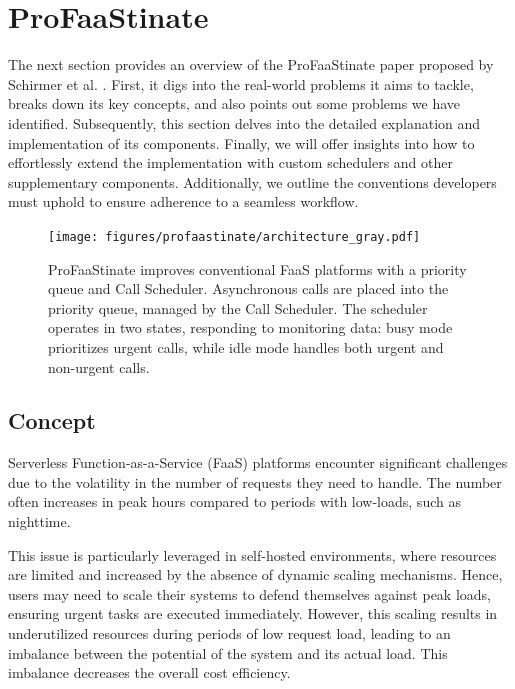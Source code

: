 
\section{ProFaaStinate}
\label{sec:profaastinate}

The next section provides an overview of the ProFaaStinate paper proposed by Schirmer et al. \cite{schirmer2023profaastinate}. First, it digs into the real-world problems it aims to tackle, breaks down its key concepts, and also points out some problems we have identified. Subsequently, this section delves into the detailed explanation and implementation of its components. Finally, we will offer insights into how to effortlessly extend the implementation with custom schedulers and other supplementary components. Additionally, we outline the conventions developers must uphold to ensure adherence to a seamless workflow.
\begin{figure}
    \centering
    \texttt{[image: figures/profaastinate/architecture\_gray.pdf]}
    \caption{ProFaaStinate improves conventional FaaS platforms with a priority queue and Call Scheduler. Asynchronous calls are placed into the priority queue, managed by the Call Scheduler. The scheduler operates in two states, responding to monitoring data: busy mode prioritizes urgent calls, while idle mode handles both urgent and non-urgent calls. \cite{schirmer2023profaastinate}}
    \label{fig:og-profaastinate}
\end{figure}

\subsection{Concept}
\label{sec:ProFaaStinate_Concept}
 
Serverless Function-as-a-Service (FaaS) platforms encounter significant challenges due to the volatility in the number of requests they need to handle. The number often increases in peak hours compared to periods with low-loads, such as nighttime.

This issue is particularly leveraged in self-hosted environments, where resources are limited and increased by the absence of dynamic scaling mechanisms. Hence, users may need to scale their systems to defend themselves against peak loads, ensuring urgent tasks are executed immediately. However, this scaling results in underutilized resources during periods of low request load, leading to an imbalance between the potential of the system and its actual load. This imbalance decreases the overall cost efficiency.

